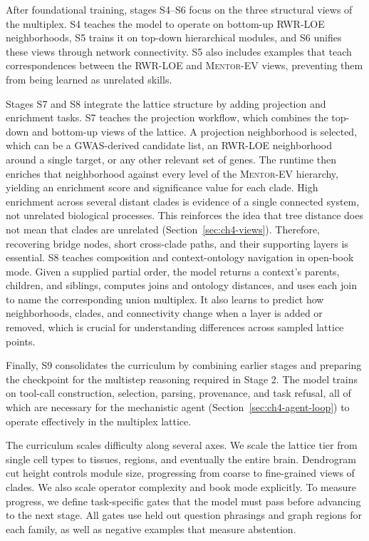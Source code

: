 \documentclass[thesis,letterpaper,12pt]{utthesis}
\begin{document}
After foundational training, stages S4--S6 focus on the three structural views of the multiplex. S4 teaches the model to operate on bottom-up RWR-LOE neighborhoods, S5 trains it on top-down hierarchical modules, and S6 unifies these views through network connectivity. S5 also includes examples that teach correspondences between the RWR-LOE and \textsc{Mentor-EV} views, preventing them from being learned as unrelated skills.

Stages S7 and S8 integrate the lattice structure by adding projection and enrichment tasks. S7 teaches the projection workflow, which combines the top-down and bottom-up views of the lattice. A projection neighborhood is selected, which can be a GWAS-derived candidate list, an RWR-LOE neighborhood around a single target, or any other relevant set of genes. The runtime then enriches that neighborhood against every level of the \textsc{Mentor-EV} hierarchy, yielding an enrichment score and significance value for each clade. High enrichment across several distant clades is evidence of a single connected system, not unrelated biological processes. This reinforces the idea that tree distance does not mean that clades are unrelated (Section~\ref{sec:ch4-views}). Therefore, recovering bridge nodes, short cross-clade paths, and their supporting layers is essential. S8 teaches composition and context-ontology navigation in open-book mode. Given a supplied partial order, the model returns a context's parents, children, and siblings, computes joins and ontology distances, and uses each join to name the corresponding union multiplex. It also learns to predict how neighborhoods, clades, and connectivity change when a layer is added or removed, which is crucial for understanding differences across sampled lattice points.

Finally, S9 consolidates the curriculum by combining earlier stages and preparing the checkpoint for the multistep reasoning required in Stage 2. The model trains on tool-call construction, selection, parsing, provenance, and task refusal, all of which are necessary for the mechanistic agent (Section~\ref{sec:ch4-agent-loop}) to operate effectively in the multiplex lattice.

The curriculum scales difficulty along several axes. We scale the lattice tier from single cell types to tissues, regions, and eventually the entire brain. Dendrogram cut height controls module size, progressing from coarse to fine-grained views of clades. We also scale operator complexity and book mode explicitly. To measure progress, we define task-specific gates that the model must pass before advancing to the next stage. All gates use held out question phrasings and graph regions for each family, as well as negative examples that measure abstention.
\end{document}
